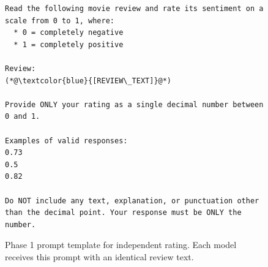 \begin{figure}[hbt]
\begin{mybox}
\begin{lstlisting}
Read the following movie review and rate its sentiment on a scale from 0 to 1, where:
  * 0 = completely negative
  * 1 = completely positive

Review:
(*@\textcolor{blue}{[REVIEW\_TEXT]}@*)

Provide ONLY your rating as a single decimal number between 0 and 1.

Examples of valid responses:
0.73
0.5
0.82

Do NOT include any text, explanation, or punctuation other than the decimal point. Your response must be ONLY the number.
\end{lstlisting}
\end{mybox}
\caption{Phase 1 prompt template for independent rating. Each model receives this prompt with an identical review text.}
\label{fig:phase1_prompt}
\end{figure}